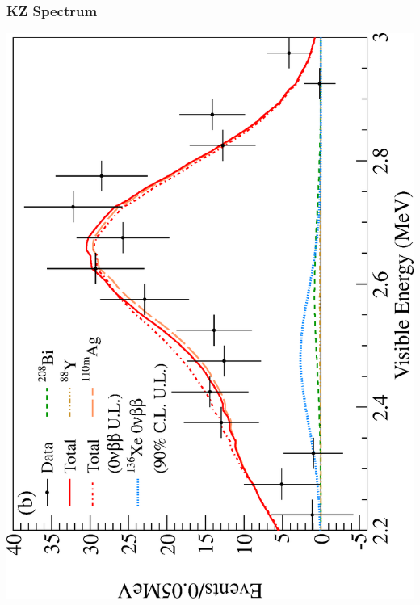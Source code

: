 \documentclass{beamer}
\begin{document}
\begin{frame}
\begin{center}
\frametitle{KZ Spectrum}
\end{center}
\begin{center}
\includegraphics[keepaspectratio=true,angle=-90,width=\textwidth]{KZ_spectrum_zoom.eps}
\end{center}
\end{frame}
\end{document}
